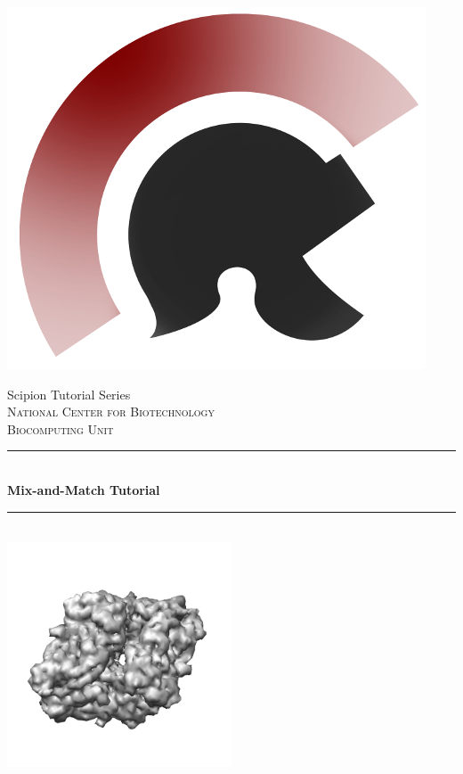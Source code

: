 \documentclass[12pt]{article} %
\begin{document}

\begin{titlepage}

\newcommand{\HRule}{\rule{\linewidth}{0.5mm}}

\center %

\includegraphics{../tutorial_common/images/scipion_logo.png}

{\large Scipion Tutorial Series}\\[1.0cm]

\textsc{\LARGE National Center for Biotechnology}\\[0.5cm]
\textsc{\Large Biocomputing Unit}\\[0.5cm]

\HRule\\[0.4cm]
{ \huge \bfseries Mix-and-Match Tutorial}\\[0.4cm] %
\HRule \\[1.5cm]


\includegraphics[width=0.5\textwidth]{images/betagal.png}


\end{titlepage}
\end{document}
